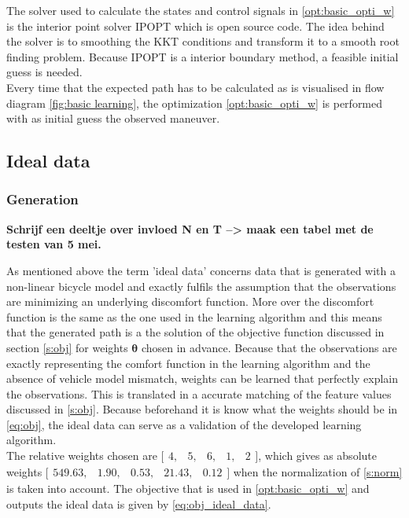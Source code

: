 The solver used to calculate the states and control signals in \ref{opt:basic_opti_w} is the interior point solver IPOPT which is open source code. The idea behind the solver is to smoothing the KKT conditions and transform it to a smooth root finding problem. \cite{Panos_opti} Because IPOPT is a interior boundary method, a feasible initial guess is needed.\\
Every time that the expected path has to be calculated as is visualised in flow diagram \ref{fig:basic learning}, the optimization \ref{opt:basic_opti_w} is performed with as initial guess the observed maneuver.\\

\subsection{Ideal data} \label{s:GD}
\subsubsection{Generation}
\textbf{Schrijf een deeltje over invloed N en T --> maak een tabel met de testen van 5 mei.}

As mentioned above the term 'ideal data' concerns data that is generated with a non-linear bicycle model and exactly fulfils the assumption that the observations are minimizing an underlying discomfort function. More over the discomfort function is the same as the one used in the learning algorithm and this means that the generated path is a the solution of the objective function discussed in section \ref{s:obj} for weights $\bm{\theta}$ chosen in advance. Because that the observations are exactly representing the comfort function in the learning algorithm and the absence of vehicle model mismatch, weights can be learned that perfectly explain the observations. This is translated in a accurate matching of the feature values discussed in \ref{s:obj}. Because beforehand it is know what the weights should be in \ref{eq:obj}, the ideal data can serve as a validation of the developed learning algorithm.\\

The relative weights chosen are $ \bigl[ \begin{smallmatrix} 4,&5,&6,&1,&2\end{smallmatrix}\bigr]$, which gives as absolute weights  $ \bigl[ \begin{smallmatrix} 549.63, &1.90, &0.53,  &21.43, &0.12\end{smallmatrix}\bigr]$ when the normalization of \ref{s:norm} is taken into account. The objective that is used in \ref{opt:basic_opti_w} and outputs the ideal data is given by \ref{eq:obj_ideal_data}.

